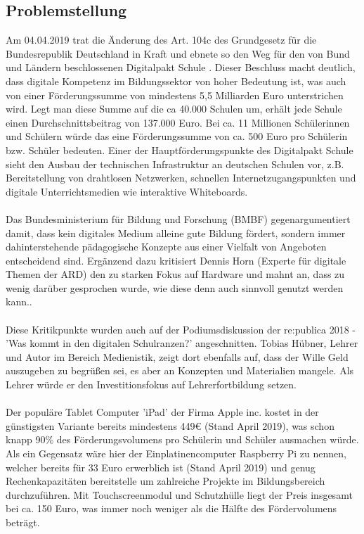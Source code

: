 \subsection{Problemstellung}\label{sec:problemstellung}
Am 04.04.2019 trat die Änderung des Art. 104c des Grundgesetz für die Bundesrepublik Deutschland in Kraft
und ebnete so den Weg für den von Bund und Ländern beschlossenen Digitalpakt Schule \cite{Art104cG55:online}. 
Dieser Beschluss macht deutlich, dass digitale Kompetenz im Bildungssektor von hoher Bedeutung ist, was auch von einer Förderungssumme von mindestens 5,5 Milliarden Euro unterstrichen wird. 
Legt man diese Summe auf die ca 40.000 Schulen um, erhält jede Schule einen Durchschnittsbeitrag von 137.000 Euro. Bei ca. 11 Millionen Schülerinnen und Schülern würde das eine Förderungssumme von ca. 500 Euro pro Schülerin bzw. Schüler bedeuten. 
Einer der Hauptförderungspunkte des Digitalpakt Schule sieht den Ausbau der technischen Infrastruktur
an deutschen Schulen vor, z.B. Bereitstellung von drahtlosen Netzwerken, schnellen Internetzugangspunkten und digitale Unterrichtsmedien wie interaktive Whiteboards.
\\ \\
Das Bundesministerium für Bildung und Forschung (BMBF) gegenargumentiert damit, dass kein digitales Medium alleine gute Bildung fördert, sondern immer dahinterstehende pädagogische Konzepte aus einer Vielfalt von Angeboten entscheidend sind. \cite{dpakt2019:online} Ergänzend dazu kritisiert Dennis Horn (Experte für digitale Themen der ARD) den zu starken Fokus auf Hardware und mahnt an, dass zu wenig darüber gesprochen wurde, wie diese denn auch sinnvoll genutzt werden kann.\cite{Horn2018:online}. \\ \\
Diese Kritikpunkte wurden auch auf der Podiumsdiskussion der re:publica 2018 - 'Was kommt in den digitalen Schulranzen?' angeschnitten. Tobias Hübner, Lehrer und Autor im Bereich Medienistik, zeigt dort ebenfalls auf, dass der Wille Geld auszugeben zu begrüßen sei, es aber an Konzepten und Materialien mangele. Als Lehrer würde er den Investitionsfokus auf Lehrerfortbildung setzen.
\\ \\
Der populäre Tablet Computer 'iPad' der Firma Apple inc. kostet in der günstigsten Variante bereits mindestens 449€ \cite{iPadmini65:online} (Stand April 2019), was schon knapp 90\% des Förderungsvolumens pro Schülerin und Schüler ausmachen würde. Als ein Gegensatz wäre hier der Einplatinencomputer Raspberry Pi zu nennen, welcher bereits für 33 Euro erwerblich ist (Stand April 2019) und genug Rechenkapazitäten bereitstelle um zahlreiche Projekte im Bildungsbereich durchzuführen. Mit Touchscreenmodul und Schutzhülle liegt der Preis insgesamt bei ca. 150 Euro, was immer noch weniger als die Hälfte des Fördervolumens beträgt. 

